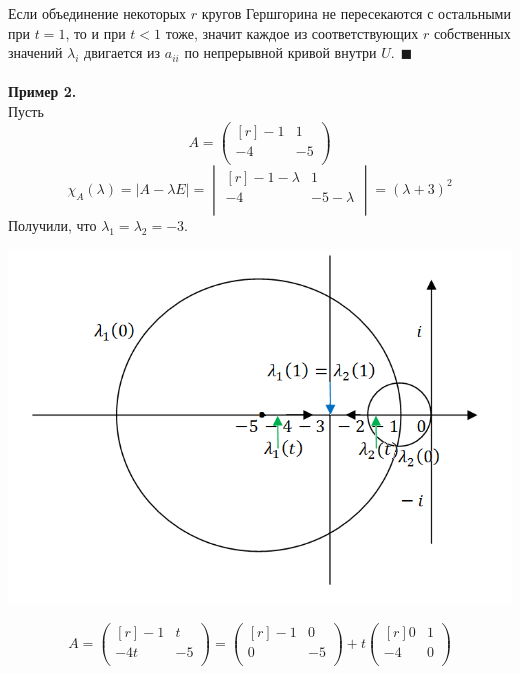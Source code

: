 \documentclass[12pt]{article}
\theoremstyle{definition}
\numberwithin{equation}{section}
\begin{document}
Если объединение некоторых $r$ кругов Гершгорина не пересекаются с остальными при $t=1$, то и при $t<1$ тоже, значит каждое из соответствующих $r$ собственных значений $\lambda_i$ двигается из $a_{ii}$ по непрерывной кривой внутри $U.~~\blacksquare$\\
\\
\textbf{Пример 2.}\\
Пусть 
\[A=\begin{pmatrix}[r]
-1 & 1 \\
-4 & -5 \\
\end{pmatrix}\]
\[\chi_A(\lambda)=|A-\lambda E|=\begin{vmatrix}[r]
-1-\lambda & 1 \\
-4 & -5-\lambda \\
\end{vmatrix}=(\lambda +3)^2\]
Получили, что $\lambda_1=\lambda_2=-3$.
\begin{center}
\includegraphics[scale=0.8]{l9_5.png}
\end{center}
\[A=\begin{pmatrix}[r]
-1 & t \\
-4t & -5 \\
\end{pmatrix}=\begin{pmatrix}[r]
-1 & 0 \\
0 & -5 \\
\end{pmatrix}+ t\begin{pmatrix}[r]
0 & 1 \\
-4 & 0 \\
\end{pmatrix}\]
\end{document}
